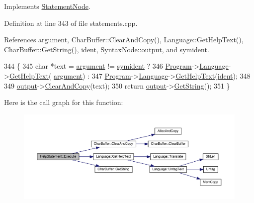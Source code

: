 Implements \hyperlink{classStatementNode_a721589622c930c010927b9a9c55b173e}{Statement\+Node}.



Definition at line 343 of file statements.\+cpp.



References argument, Char\+Buffer\+::\+Clear\+And\+Copy(), Language\+::\+Get\+Help\+Text(), Char\+Buffer\+::\+Get\+String(), ident, Syntax\+Node\+::output, and symident.


\begin{DoxyCode}
344 \{
345     \textcolor{keywordtype}{char} *text = \hyperlink{classHelpStatement_abef33224fd4d73c2501217dba61dd395}{argument} != \hyperlink{lex_8h_a7feef761cd73fac6e25b8bb80d2c4e54ade7694e5efc9616383548e57122faea5}{symident} ?
346                  \hyperlink{classProgram}{Program}->\hyperlink{classProgram_a7c82b4c429bbee984b8bb287b9e137f7}{Language}->\hyperlink{classLanguage_a0044feceac32f8ce943b88165ade965e}{GetHelpText}(
      \hyperlink{classHelpStatement_abef33224fd4d73c2501217dba61dd395}{argument}) :
347                  \hyperlink{classProgram}{Program}->\hyperlink{classProgram_a7c82b4c429bbee984b8bb287b9e137f7}{Language}->\hyperlink{classLanguage_a0044feceac32f8ce943b88165ade965e}{GetHelpText}(\hyperlink{classHelpStatement_a464f49dcbd47d1050df5b822aaffc839}{ident});
348 
349     \hyperlink{classSyntaxNode_a1180628cbe3fce43930cee0df5a9ce5c}{output}->\hyperlink{classCharBuffer_ac52ed7b91190240eb7db4cf43d1e2abb}{ClearAndCopy}(text);
350     \textcolor{keywordflow}{return} \hyperlink{classSyntaxNode_a1180628cbe3fce43930cee0df5a9ce5c}{output}->\hyperlink{classCharBuffer_a7dfd3feaaf80f318ba44efe15b1ec44b}{GetString}();
351 \}
\end{DoxyCode}


Here is the call graph for this function\+:
\nopagebreak
\begin{figure}[H]
\begin{center}
\leavevmode
\includegraphics[width=350pt]{d2/dab/classHelpStatement_a733d3471c3bcfdd2d07d4766bbdbf6db_cgraph}
\end{center}
\end{figure}




